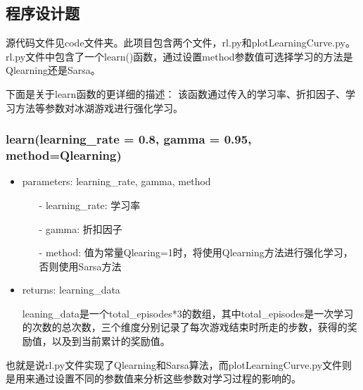 \documentclass{article}
\begin{document}
\subsection*{程序设计题}
源代码文件见code文件夹。此项目包含两个文件，rl.py和plotLearningCurve.py。
rl.py文件中包含了一个learn()函数，通过设置method参数值可选择学习的方法是Qlearning还是Sarsa。

下面是关于learn函数的更详细的描述：
该函数通过传入的学习率、折扣因子、学习方法等参数对冰湖游戏进行强化学习。
\subsubsection*{learn(learning\_rate = 0.8, gamma = 0.95, method=Qlearning)}
\begin{itemize}
\item parameters: learning\_rate, gamma, method
	\begin{itemize}
		\item[-] 
		learning\_rate: 学习率
		\item[-] 
		gamma: 折扣因子
		\item[-] 
		method: 值为常量Qlearing=1时，将使用Qlearning方法进行强化学习，否则使用Sarsa方法
	\end{itemize}
\item returns: learning\_data

leaning\_data是一个total\_episodes*3的数组，其中total\_episodes是一次学习的次数的总次数，三个维度分别记录了每次游戏结束时所走的步数，获得的奖励值，以及到当前累计的奖励值。

\end{itemize}

也就是说rl.py文件实现了Qlearning和Sarsa算法，而plotLearningCurve.py文件则是用来通过设置不同的参数值来分析这些参数对学习过程的影响的。
\end{document}
